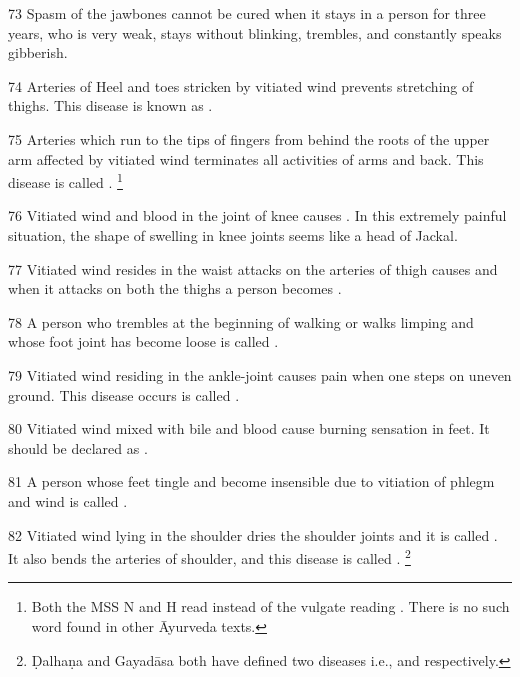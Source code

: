 \begin{translation}
\item[73] Spasm of the jawbones cannot be cured when it stays in a person for three years, who is very weak, stays without blinking, trembles, and constantly speaks gibberish.

\item[74] Arteries of Heel and toes stricken by vitiated wind prevents stretching 
of thighs. This disease is known as .

\item[75] Arteries which run to the tips of fingers from behind the roots of the 
upper arm affected by vitiated wind terminates all activities of arms and back. 
This disease is called . \footnote{Both 
the MSS N and H read  instead of the vulgate reading 
. There is no such word found in other Āyurveda texts.}

\item[76] Vitiated wind and blood in the joint of knee causes 
. In this extremely painful situation, the 
shape of swelling in knee joints seems like a head of Jackal. 

\item[77] Vitiated wind resides in the waist attacks on the arteries of thigh 
causes  and when it attacks on both the thighs a person 
becomes .

\item[78] A person who trembles at the beginning of walking or walks limping 
and whose foot joint has become loose is called .

\item[79] Vitiated wind residing in the ankle-joint causes pain when one steps on uneven ground. This disease occurs is called .

\item[80] Vitiated wind mixed with bile and blood cause burning sensation in feet. 
It should be declared as .

\item[81] A person whose feet tingle and become insensible due to vitiation of phlegm and wind is called .

\item[82] Vitiated wind lying in the shoulder dries the shoulder joints and it is called . It also bends the arteries of shoulder, and this disease is called . \footnote{Ḍalhaṇa and Gayadāsa both have defined two diseases i.e.,  and  respectively.}


\end{translation}
